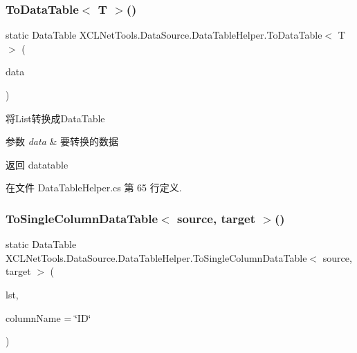 \subsubsection{\texorpdfstring{To\+Data\+Table$<$ T $>$()}{ToDataTable< T >()}}
{\footnotesize\ttfamily static Data\+Table X\+C\+L\+Net\+Tools.\+Data\+Source.\+Data\+Table\+Helper.\+To\+Data\+Table$<$ T $>$ (\begin{DoxyParamCaption}\item[{I\+List$<$ T $>$}]{data }\end{DoxyParamCaption})\hspace{0.3cm}{\ttfamily [static]}}



将\+List转换成\+Data\+Table 


\begin{DoxyParams}{参数}
{\em data} & 要转换的数据\\
\hline
\end{DoxyParams}
\begin{DoxyReturn}{返回}
datatable
\end{DoxyReturn}


在文件 Data\+Table\+Helper.\+cs 第 65 行定义.

\mbox{\label{class_x_c_l_net_tools_1_1_data_source_1_1_data_table_helper_a1857097ac0d5c70dc583967cfab013cd}} 
\subsubsection{\texorpdfstring{To\+Single\+Column\+Data\+Table$<$ source, target $>$()}{ToSingleColumnDataTable< source, target >()}}
{\footnotesize\ttfamily static Data\+Table X\+C\+L\+Net\+Tools.\+Data\+Source.\+Data\+Table\+Helper.\+To\+Single\+Column\+Data\+Table$<$ source, target $>$ (\begin{DoxyParamCaption}\item[{List$<$ source $>$}]{lst,  }\item[{string}]{column\+Name = {\ttfamily \char`\"{}ID\char`\"{}} }\end{DoxyParamCaption})\hspace{0.3cm}{\ttfamily [static]}}




